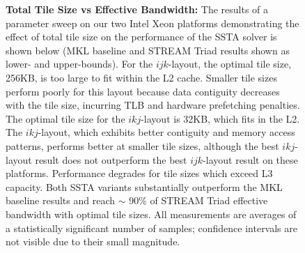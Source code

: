 \documentclass{sig-alternate-05-2015}
\begin{document}
\begin{figure}[!bth]
  \centering
  \caption{
    \textbf{Total Tile Size vs Effective Bandwidth:}
    The results of a parameter sweep on our two Intel Xeon platforms
      demonstrating the effect of total tile size on the performance of the
      SSTA solver is shown below (MKL baseline and STREAM Triad results shown as
      lower- and upper-bounds).
    For the \(ijk\)-layout, the optimal tile size, 256KB, is too large to fit
      within the L2 cache.
    Smaller tile sizes perform poorly for this layout because data contiguity
      decreases with the tile size, incurring TLB and hardware prefetching
      penalties.
    The optimal tile size for the \(ikj\)-layout is 32KB, which fits in the L2. 
    The \(ikj\)-layout, which exhibits better contiguity and memory access
      patterns, performs better at smaller tile sizes, although the best
      \(ikj\)-layout result does not outperform the best \(ijk\)-layout result
      on these platforms.
    Performance degrades for tile sizes which exceed L3 capacity.
    Both SSTA variants substantially outperform the MKL baseline results and 
      reach \(\sim\) 90\% of STREAM Triad effective bandwidth with optimal 
      tile sizes.
    All measurements are averages of a statistically significant number of
      samples; confidence intervals are not visible due to their small magnitude.
  }
  \label{fig:results:tile_size_xeon}
  \vspace{1em}
  \begin{minipage}{0.49\textwidth}
\end{minipage}
\end{figure}
\end{document}
